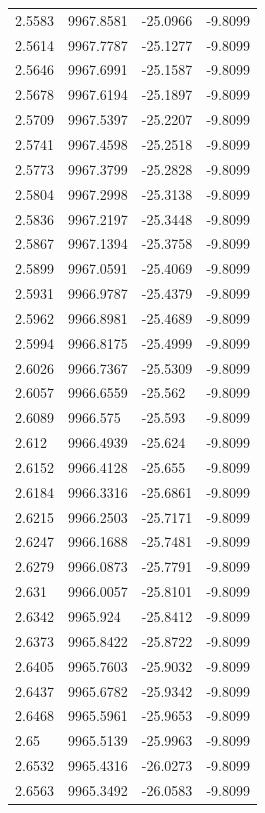 \begin{table}[H]
\begin{tabular}{llll}
2.5583 & 9967.8581 & -25.0966 & -9.8099 \\
2.5614 & 9967.7787 & -25.1277 & -9.8099 \\
2.5646 & 9967.6991 & -25.1587 & -9.8099 \\
2.5678 & 9967.6194 & -25.1897 & -9.8099 \\
2.5709 & 9967.5397 & -25.2207 & -9.8099 \\
2.5741 & 9967.4598 & -25.2518 & -9.8099 \\
2.5773 & 9967.3799 & -25.2828 & -9.8099 \\
2.5804 & 9967.2998 & -25.3138 & -9.8099 \\
2.5836 & 9967.2197 & -25.3448 & -9.8099 \\
2.5867 & 9967.1394 & -25.3758 & -9.8099 \\
2.5899 & 9967.0591 & -25.4069 & -9.8099 \\
2.5931 & 9966.9787 & -25.4379 & -9.8099 \\
2.5962 & 9966.8981 & -25.4689 & -9.8099 \\
2.5994 & 9966.8175 & -25.4999 & -9.8099 \\
2.6026 & 9966.7367 & -25.5309 & -9.8099 \\
2.6057 & 9966.6559 & -25.562 & -9.8099 \\
2.6089 & 9966.575 & -25.593 & -9.8099 \\
2.612 & 9966.4939 & -25.624 & -9.8099 \\
2.6152 & 9966.4128 & -25.655 & -9.8099 \\
2.6184 & 9966.3316 & -25.6861 & -9.8099 \\
2.6215 & 9966.2503 & -25.7171 & -9.8099 \\
2.6247 & 9966.1688 & -25.7481 & -9.8099 \\
2.6279 & 9966.0873 & -25.7791 & -9.8099 \\
2.631 & 9966.0057 & -25.8101 & -9.8099 \\
2.6342 & 9965.924 & -25.8412 & -9.8099 \\
2.6373 & 9965.8422 & -25.8722 & -9.8099 \\
2.6405 & 9965.7603 & -25.9032 & -9.8099 \\
2.6437 & 9965.6782 & -25.9342 & -9.8099 \\
2.6468 & 9965.5961 & -25.9653 & -9.8099 \\
2.65 & 9965.5139 & -25.9963 & -9.8099 \\
2.6532 & 9965.4316 & -26.0273 & -9.8099 \\
2.6563 & 9965.3492 & -26.0583 & -9.8099 \\

\end{tabular}
\end{table}
